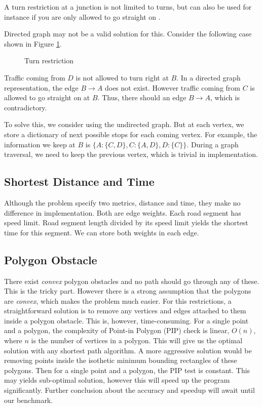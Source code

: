 \documentclass[11pt]{article}
\begin{document}
A turn restriction at a junction is not limited to turns, but can
also be used for instance if you are only allowed to go straight
on \cite{osm:wiki:restriction}.

Directed graph may not be a valid solution for this.  Consider the
following case shown in Figure \ref{fig:turn}.

\begin{figure}[ht]
\label{fig:turn}
\centering

\caption{Turn restriction}\label{fig:turn}
\end{figure}

Traffic coming from \(D\) is not allowed to turn right at \(B\).
In a directed graph representation, the edge \(B\to A\) does not
exist.  However traffic coming from \(C\) is allowed to go straight
on at \(B\).  Thus, there should an edge \(B\to A\), which is
contradictory.

To solve this, we consider using the undirected graph.  But at each
vertex, we store a dictionary of next possible stops for each
coming vertex.  For example, the information we keep at \(B\) is
\(\{A: \{C, D\}, C: \{A, D\}, D: \{C\}\}\).  During a graph
traversal, we need to keep the previous vertex, which is trivial in
implementation.

\subsection{Shortest Distance and Time}
\label{sec-2-2}

Although the problem specify two metrics, distance and time, they
make no difference in implementation.  Both are edge weights.  Each
road segment has speed limit.  Road segment length divided by its
speed limit yields the shortest time for this segment.  We can
store both weights in each edge.

\subsection{Polygon Obstacle}
\label{sec-2-3}

There exist \emph{convex} polygon obstacles and no path should go
through any of these.  This is the tricky part.  However there is a
strong assumption that the polygons are \emph{convex}, which makes the
problem much easier.  For this restrictions, a straightforward
solution is to remove any vertices and edges attached to them
inside a polygon obstacle.  This is, however, time-consuming.  For
a single point and a polygon, the complexity of Point-in Polygon
(PIP) check is linear, \(O(n)\), where \(n\) is the number of
vertices in a polygon.  This will give us the optimal solution with
any shortest path algorithm.  A more aggressive solution would be
removing points inside the isothetic minimum bounding rectangles of
these polygons.  Then for a single point and a polygon, the PIP
test is constant.  This may yields sub-optimal solution, however
this will speed up the program significantly.  Further conclusion
about the accuracy and speedup will await until our benchmark.
\end{document}
